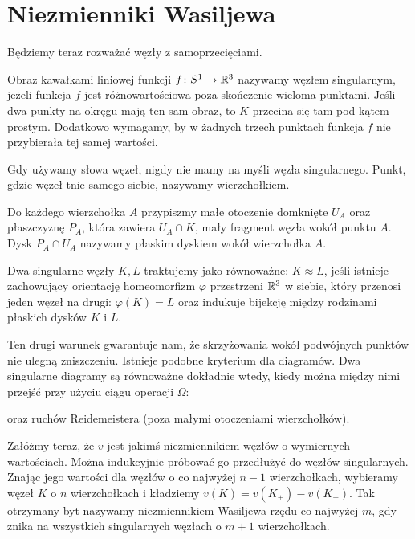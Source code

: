 \section{Niezmienniki Wasiljewa} %
\label{sec:vassiliev}
Będziemy teraz rozważać węzły z samoprzecięciami.

\begin{definition}
	Obraz kawałkami liniowej funkcji $f \colon S^1 \to \mathbb R^3$ nazywamy węzłem singularnym, jeżeli funkcja $f$ jest różnowartościowa poza skończenie wieloma punktami.
	Jeśli dwa punkty na okręgu mają ten sam obraz, to $K$ przecina się tam pod kątem prostym.
	Dodatkowo wymagamy, by w żadnych trzech punktach funkcja $f$ nie przybierała tej samej wartości.
\end{definition}

Gdy używamy słowa węzeł, nigdy nie mamy na myśli węzła singularnego.
Punkt, gdzie węzeł tnie samego siebie, nazywamy wierzchołkiem.

Do każdego wierzchołka $A$ przypiszmy małe otoczenie domknięte $U_A$ oraz płaszczyznę $P_A$, która zawiera $U_A \cap K$, mały fragment węzła wokół punktu $A$. Dysk $P_A \cap U_A$ nazywamy płaskim dyskiem wokół wierzchołka $A$.

\begin{definition}
	Dwa singularne węzły $K, L$ traktujemy jako równoważne: $K \approx L$, jeśli istnieje zachowujący orientację homeomorfizm $\varphi$ przestrzeni $\mathbb R^3$ w siebie, który przenosi jeden węzeł na drugi: $\varphi(K) = L$ oraz indukuje bijekcję między rodzinami płaskich dysków $K$ i $L$.
\end{definition}

Ten drugi warunek gwarantuje nam, że skrzyżowania wokół podwójnych punktów nie ulegną zniszczeniu.
Istnieje podobne kryterium dla diagramów.
Dwa singularne diagramy są równoważne dokładnie wtedy, kiedy można między nimi przejść przy użyciu ciągu operacji $\Omega$:

oraz ruchów Reidemeistera (poza małymi otoczeniami wierzchołków).

Załóżmy teraz, że $v$ jest jakimś niezmiennikiem węzłów o wymiernych wartościach.
Można indukcyjnie próbować go przedłużyć do węzłów singularnych.
Znając jego wartości dla węzłów o co najwyżej $n - 1$ wierzchołkach,  wybieramy węzeł $K$ o $n$ wierzchołkach i kładziemy $v(K) = v(K_+) - v(K_-)$.
Tak otrzymany byt nazywamy niezmiennikiem Wasiljewa rzędu co najwyżej $m$, gdy znika na wszystkich singularnych węzłach o $m + 1$ wierzchołkach.

